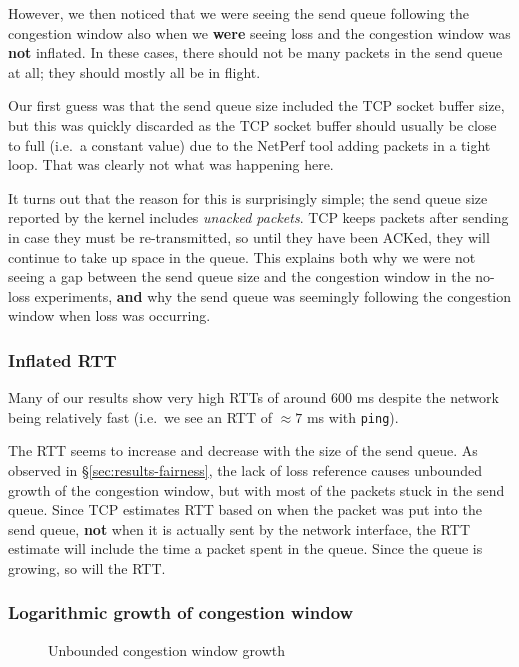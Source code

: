 However, we then noticed that we were seeing the send queue following the
congestion window also when we \textbf{were} seeing loss and the congestion
window was \textbf{not} inflated. In these cases, there should not be many
packets in the send queue at all; they should mostly all be in flight.

Our first guess was that the send queue size included the TCP socket buffer
size, but this was quickly discarded as the TCP socket buffer should usually be
close to full (i.e.\ a constant value) due to the NetPerf tool adding packets in
a tight loop. That was clearly not what was happening here.

It turns out that the reason for this is surprisingly simple; the send queue
size reported by the kernel includes \textit{unacked packets}. TCP keeps packets
after sending in case they must be re-transmitted, so until they have been
ACKed, they will continue to take up space in the queue. This explains both why
we were not seeing a gap between the send queue size and the congestion window
in the no-loss experiments, \textbf{and} why the send queue was seemingly
following the congestion window when loss was occurring.

\subsubsection{Inflated RTT}
Many of our results show very high RTTs of around 600 ms despite the network
being relatively fast (i.e.\ we see an RTT of $\approx 7$ ms with
\texttt{ping}). 

The RTT seems to increase and decrease with the size of the send queue. As 
observed in \S\ref{sec:results-fairness}, the lack of loss reference causes 
unbounded growth of the congestion window, but with most of the packets stuck in 
the send queue. Since TCP estimates RTT based on when the packet was put into 
the send queue, \textbf{not} when it is actually sent by the network interface, 
the RTT estimate will include the time a packet spent in the queue. Since the 
queue is growing, so will the RTT.

\subsubsection{Logarithmic growth of congestion window}

\begin{figure}[h]
 \centering
 
 \caption{Unbounded congestion window growth}\label{graph:logarithmic}
\end{figure}

